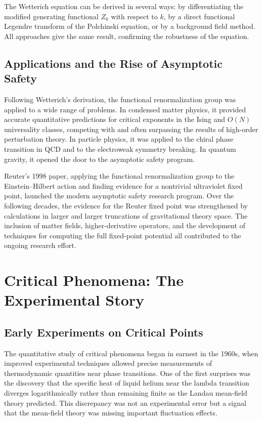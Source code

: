 \documentclass[11pt, twoside, openright]{book}
\theoremstyle{dotted}
\theoremstyle{definition}
\begin{document}
The Wetterich equation can be derived in several ways: by differentiating the
modified generating functional $Z_k$ with respect to $k$, by a direct functional
Legendre transform of the Polchinski equation, or by a background field method.
All approaches give the same result, confirming the robustness of the equation.

\section{Applications and the Rise of Asymptotic Safety}

Following Wetterich's derivation, the functional renormalization group was applied
to a wide range of problems. In condensed matter physics, it provided accurate
quantitative predictions for critical exponents in the Ising and $O(N)$ universality
classes, competing with and often surpassing the results of high-order perturbation
theory. In particle physics, it was applied to the chiral phase transition in QCD
and to the electroweak symmetry breaking. In quantum gravity, it opened the door
to the asymptotic safety program.

Reuter's 1998 paper, applying the functional renormalization group to the
Einstein--Hilbert action and finding evidence for a nontrivial ultraviolet fixed
point, launched the modern asymptotic safety research program. Over the following
decades, the evidence for the Reuter fixed point was strengthened by calculations
in larger and larger truncations of gravitational theory space. The inclusion of
matter fields, higher-derivative operators, and the development of techniques for
computing the full fixed-point potential all contributed to the ongoing research
effort.

\chapter{Critical Phenomena: The Experimental Story}
\label{ch:experimental_critical}

\section{Early Experiments on Critical Points}

The quantitative study of critical phenomena began in earnest in the 1960s, when
improved experimental techniques allowed precise measurements of thermodynamic
quantities near phase transitions. One of the first surprises was the discovery
that the specific heat of liquid helium near the lambda transition diverges
logarithmically rather than remaining finite as the Landau mean-field theory
predicted. This discrepancy was not an experimental error but a signal that the
mean-field theory was missing important fluctuation effects.
\end{document}
